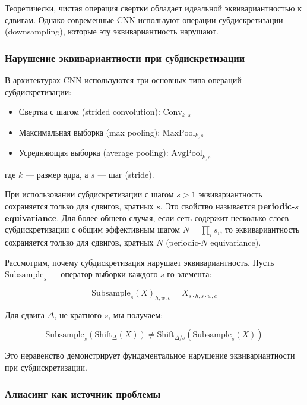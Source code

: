 Теоретически, чистая операция свертки обладает идеальной эквивариантностью к сдвигам. Однако современные CNN используют операции субдискретизации (downsampling), которые эту эквивариантность нарушают.

\subsubsection{Нарушение эквивариантности при субдискретизации}

В архитектурах CNN используются три основных типа операций субдискретизации:
\begin{itemize}
    \item Свертка с шагом (strided convolution): $\text{Conv}_{k,s}$
    \item Максимальная выборка (max pooling): $\text{MaxPool}_{k,s}$
    \item Усредняющая выборка (average pooling): $\text{AvgPool}_{k,s}$
\end{itemize}

где $k$ — размер ядра, а $s$ — шаг (stride).

При использовании субдискретизации с шагом $s > 1$ эквивариантность сохраняется только для сдвигов, кратных $s$. Это свойство называется \textbf{periodic-$s$ equivariance}. Для более общего случая, если сеть содержит несколько слоев субдискретизации с общим эффективным шагом $N = \prod_i s_i$, то эквивариантность сохраняется только для сдвигов, кратных $N$ (periodic-$N$ equivariance).

Рассмотрим, почему субдискретизация нарушает эквивариантность. Пусть $\text{Subsample}_s$ — оператор выборки каждого $s$-го элемента:

\begin{equation}
\text{Subsample}_s(X)_{h,w,c} = X_{s \cdot h, s \cdot w, c}
\end{equation}

Для сдвига $\Delta$, не кратного $s$, мы получаем:

\begin{equation}
\text{Subsample}_s(\text{Shift}_{\Delta}(X)) \neq \text{Shift}_{\Delta/s}(\text{Subsample}_s(X))
\end{equation}

Это неравенство демонстрирует фундаментальное нарушение эквивариантности при субдискретизации.

\subsubsection{Алиасинг как источник проблемы}

